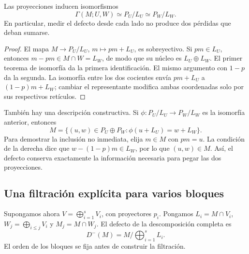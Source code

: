 \begin{proposicion}
\label{prop:ti-pegado}
Las proyecciones inducen isomorfismos
\begin{equation}
 \Gamma(M;U,W)\simeq P_U/L_U\simeq P_W/L_W.
 \label{eq:ti-pegado-iso}
\end{equation}
En particular, medir el defecto desde cada lado no produce dos
pérdidas que deban sumarse.
\end{proposicion}
\begin{proof}
El mapa $M\to P_U/L_U$, $m\mapsto pm+L_U$, es sobreyectivo.
Si $pm\in L_U$, entonces $m-pm\in M\cap W=L_W$, de modo que
su núcleo es $L_U\oplus L_W$. El primer teorema de isomorfía
da la primera identificación. El mismo argumento con $1-p$
da la segunda. La isomorfía entre los dos cocientes envía
$pm+L_U$ a $(1-p)m+L_W$; cambiar el representante modifica
ambas coordenadas solo por sus respectivos retículos.
\end{proof}

También hay una descripción constructiva. Si $\phi:P_U/L_U\to
P_W/L_W$ es la isomorfía anterior, entonces
\begin{equation}
 M=\{(u,w)\in P_U\oplus P_W:
                    \phi(u+L_U)=w+L_W\}.
 \label{eq:ti-fibra}
\end{equation}
Para demostrar la inclusión no inmediata, elija $m\in M$ con
$pm=u$. La condición de la derecha dice que
$w-(1-p)m\in L_W$, por lo que $(u,w)\in M$.
Así, el defecto conserva exactamente la información necesaria
para pegar las dos proyecciones.

\subsection{Una filtración explícita para varios bloques}

Supongamos ahora $V=\bigoplus_{i=1}^s V_i$, con proyectores $p_i$.
Pongamos $L_i=M\cap V_i$, $W_j=\bigoplus_{i\le j}V_i$ y
$M_j=M\cap W_j$. El defecto de la descomposición completa es
\begin{equation}
 D^-(M)=M/\bigoplus_{i=1}^s L_i.
 \label{eq:ti-defecto-total}
\end{equation}
El orden de los bloques se fija antes de construir la filtración.

